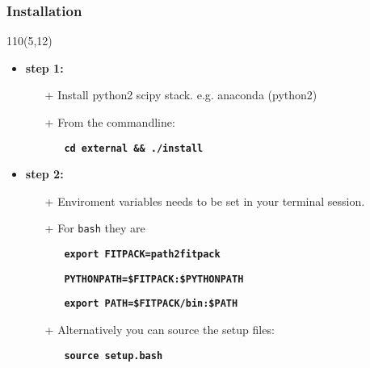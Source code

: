 \begin{frame}
\frametitle{\textbf{Installation}}
\begin{textblock}{110}(5,12) 

\begin{itemize}
\item \textbf{step 1:}
  \begin{itemize}
  \item[+] Install python2 scipy stack. e.g. anaconda (python2) 
  \item[+] From the commandline:  
     \begin{itemize}
     \item[] \textbf{\texttt{cd external \&\& ./install}}
     \end{itemize}
  \end{itemize}

\item \textbf{step 2:}
  \begin{itemize}
     \item[+] Enviroment variables needs to be set in your
     terminal session. 
     \item[+] For \texttt{bash} they are
        \begin{itemize}
        \item[] \textbf{\texttt{export FITPACK=path2fitpack}}
        \item[] \textbf{\texttt{PYTHONPATH=\$FITPACK:\$PYTHONPATH}}
        \item[] \textbf{\texttt{export PATH=\$FITPACK/bin:\$PATH}}
        \end{itemize}
     \item[+] Alternatively you can source the setup files:
        \begin{itemize}
        \item[] \textbf{\texttt{source  setup.bash}}
        \end{itemize}
  \end{itemize}
\end{itemize}

\end{textblock}
\end{frame}

